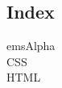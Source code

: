 \documentclass[11pt]{article}
\begin{document}
\subsection*{Index}
\label{sec:orgf33b4ed}
\begin{description}
\item[{emsAlpha}]

\item[{CSS}]

\item[{HTML}]
\end{description}
\end{document}
